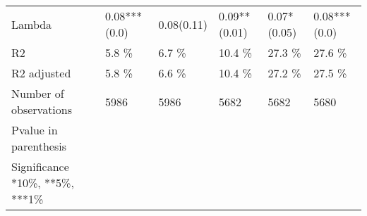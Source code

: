 \begin{tabular}{llllll}
Lambda                          &   0.08***(0.0) &     0.08(0.11) &   0.09**(0.01) &    0.07*(0.05) &   0.08***(0.0) \\
R2                              &          5.8 \% &          6.7 \% &         10.4 \% &         27.3 \% &         27.6 \% \\
R2 adjusted                     &          5.8 \% &          6.6 \% &         10.4 \% &         27.2 \% &         27.5 \% \\
Number of observations          &           5986 &           5986 &           5682 &           5682 &           5680 \\
Pvalue in parenthesis           &                &                &                &                &                \\
Significance *10\%, **5\%, ***1\%  &                &                &                &                &                \\
\bottomrule
\end{tabular}
